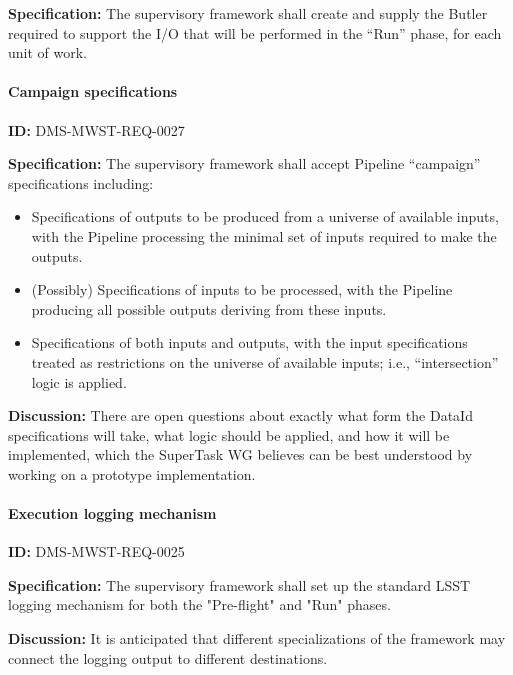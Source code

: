 \documentclass[SE,toc,lsstdraft]{lsstdoc}
\begin{document}
\textbf{Specification:}
The supervisory framework shall create and supply the Butler required to support the I/O that will be performed in the “Run” phase, for each unit of work.

\paragraph{Campaign specifications}\hfill  %

\label{DMS-MWST-REQ-0027}
\textbf{ID:} DMS-MWST-REQ-0027

\textbf{Specification:}
The supervisory framework shall accept Pipeline “campaign” specifications including:

    \begin{itemize}
\item
Specifications of outputs to be produced from a universe of available inputs, with the Pipeline processing the minimal set of inputs required to make the outputs.

\item
(Possibly) Specifications of inputs to be processed, with the Pipeline producing all possible outputs deriving from these inputs.

\item
Specifications of both inputs and outputs, with the input specifications treated as restrictions on the universe of available inputs; i.e., “intersection” logic is applied.

    \end{itemize}

\textbf{Discussion:}
There are open questions about exactly what form the DataId specifications will take, what logic should be applied, and how it will be implemented, which the SuperTask WG believes can be best understood by working on a prototype implementation.

\paragraph{Execution logging mechanism}\hfill  %

\label{DMS-MWST-REQ-0025}
\textbf{ID:} DMS-MWST-REQ-0025

\textbf{Specification:}
The supervisory framework shall set up the standard LSST logging mechanism for both the "Pre-flight" and "Run" phases.

\textbf{Discussion:}
It is anticipated that different specializations of the framework may connect the logging output to different destinations.
\end{document}
